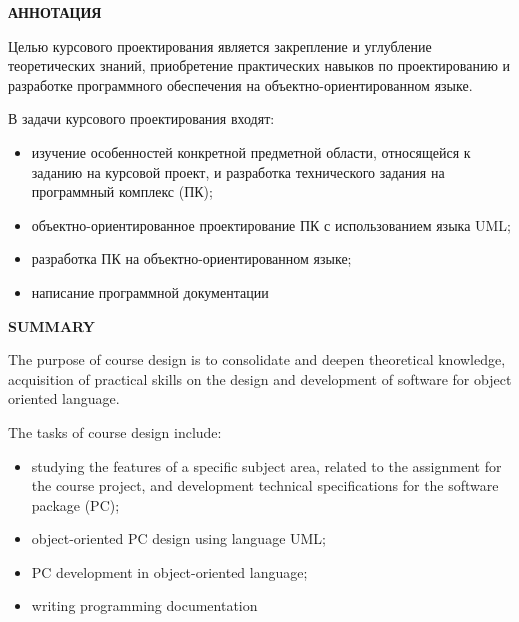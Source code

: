 \begin{center}
    \uppercase{\textbf{Аннотация}}
\end{center}

Целью курсового проектирования является закрепление и углубление теоретических
знаний, приобретение практических навыков по проектированию и разработке
программного обеспечения на объектно-ориентированном языке.

В задачи курсового проектирования входят:
\begin{itemize}
    \item изучение   особенностей   конкретной   предметной   области,
        относящейся к  заданию  на  курсовой  проект,  и  разработка
        технического задания на программный комплекс (ПК);
    \item объектно-ориентированное  проектирование ПК  с  использованием языка
        UML;
    \item разработка ПК на объектно-ориентированном языке;
    \item написание программной документации
\end{itemize}



\begin{center}
    \uppercase{\textbf{Summary}}
\end{center}

The purpose of course design is to consolidate and deepen theoretical
knowledge, acquisition of practical skills on the design and development of
software for object oriented language.

The tasks of course design include:
\begin{itemize}
    \item studying the features of a specific subject area, related to the
        assignment for the course project, and development technical
        specifications for the software package (PC);
    \item object-oriented PC design using language UML;
    \item PC development in object-oriented language;
    \item writing programming documentation
\end{itemize}


\clearpage

